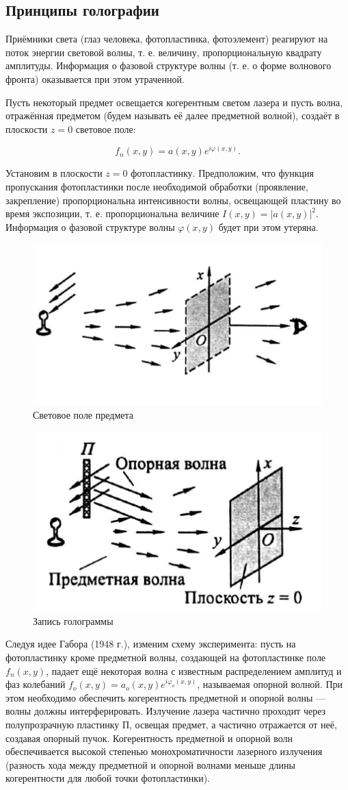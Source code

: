 \documentclass[a4paper,12pt]{article}
\begin{document}
\subsection{Принципы голографии}

Приёмники света (глаз человека, фотопластинка, фотоэлемент) реагируют на поток энергии световой волны, т. е. величину, пропорциональную квадрату амплитуды. Информация о фазовой структуре волны (т. е. о форме волнового фронта) оказывается при этом утраченной.

Пусть некоторый предмет освещается когерентным светом лазера и пусть волна, отражённая предметом (будем называть её далее предметной волной), создаёт в плоскости \( z = 0 \) световое поле:

\[ f_n(x,y) = a(x,y)e^{i\varphi(x,y)}. \]

Установим в плоскости \( z = 0 \) фотопластинку. Предположим, что функция пропускания фотопластинки после необходимой обработки (проявление, закрепление) пропорциональна интенсивности волны, освещающей пластину во время экспозиции, т. е. пропорциональна величине \( I(x,y) = |a(x,y)|^2 \). Информация о фазовой структуре волны \(\varphi(x,y)\) будет при этом утеряна.

\begin{figure}[h]
\centering
\includegraphics[width=0.2\linewidth]{img2.png}
\caption{Световое поле предмета}
\label{img2}
\end{figure}

\begin{figure}[h]
\centering
\includegraphics[width=0.2\linewidth]{img3.png}
\caption{Запись голограммы}
\label{img3}
\end{figure}

Следуя идее Габора (1948 г.), изменим схему эксперимента: пусть на фотопластинку кроме предметной волны, создающей на фотопластинке поле \( f_n(x,y) \), падает ещё некоторая волна с известным распределением амплитуд и фаз колебаний \( f_o(x,y) = a_o(x,y)e^{i\varphi_o(x,y)} \), называемая опорной волной. При этом необходимо обеспечить когерентность предметной и опорной волны — волны должны интерферировать. Излучение лазера частично проходит через полупрозрачную пластинку П, освещая предмет, а частично отражается от неё, создавая опорный пучок. Когерентность предметной и опорной волн обеспечивается высокой степенью монохроматичности лазерного излучения (разность хода между предметной и опорной волнами меньше длины когерентности для любой точки фотопластинки).
\end{document}
